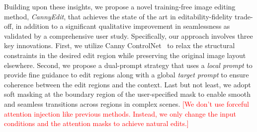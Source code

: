 \documentclass{article}
\begin{document}











Building upon these insights, we propose a novel training-free image editing method, \emph{CannyEdit}, that achieves the state of the art in editability-fidelity trade-off, in addition to a significant qualitative improvement in seamlessness as validated by a comprehensive user study.
Specifically, our approach involves three key innovations.
First, we utilize Canny ControlNet~\citep{zhang2023adding} to relax the structural constraints in the desired edit region while preserving the original image layout elsewhere.
Second, we propose a dual-prompt strategy that uses a \emph{local prompt} to provide fine guidance to edit regions along with a global \emph{target prompt} to ensure coherence between the edit regions and the context.
Last but not least, we adopt soft masking at the boundary region of the user-specified mask to enable smooth and seamless transitions across regions in complex scenes. \textcolor{red}{[We don't use forceful attention injection like previous methods. Instead, we only change the input conditions and the attention masks to achieve natural edits.]}
\end{document}
